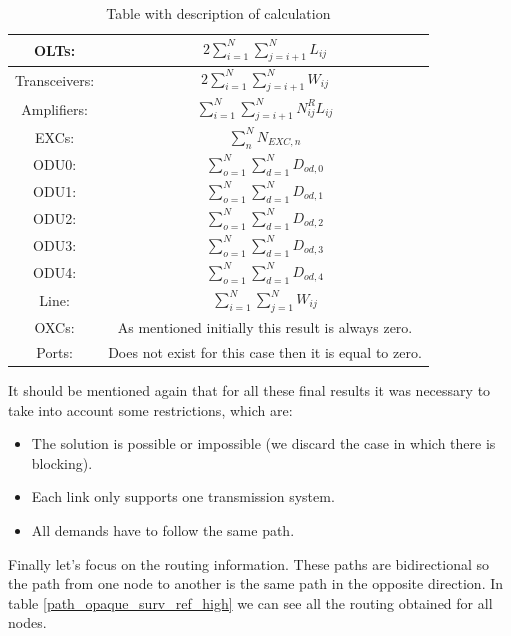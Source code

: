 \begin{table}[h!]
\centering
\begin{tabular}{|| c | c ||}
 \hline
 OLTs: & \(\displaystyle 2 \sum_{i=1}^{N}\sum_{j=i+1}^{N} L_{ij} \) \\ \hline
 Transceivers: & \(\displaystyle 2 \sum_{i=1}^{N}\sum_{j=i+1}^{N} W_{ij} \) \\ \hline
 Amplifiers: & \(\displaystyle \sum_{i=1}^{N}\sum_{j=i+1}^{N} N^R_{ij} L_{ij} \) \\ \hline
 EXCs: & \(\displaystyle \sum_n^N N_{EXC,n} \) \\ \hline
 ODU0: & \(\displaystyle \sum_{o=1}^{N}\sum_{d=1}^{N} D_{od,0} \) \\ \hline
 ODU1: & \(\displaystyle \sum_{o=1}^{N}\sum_{d=1}^{N} D_{od,1} \) \\ \hline
 ODU2: & \(\displaystyle \sum_{o=1}^{N}\sum_{d=1}^{N} D_{od,2} \)\\ \hline
 ODU3: & \(\displaystyle \sum_{o=1}^{N}\sum_{d=1}^{N} D_{od,3} \) \\ \hline
 ODU4: & \(\displaystyle \sum_{o=1}^{N}\sum_{d=1}^{N} D_{od,4} \) \\ \hline
 Line: & \(\displaystyle \sum_{i=1}^{N}\sum_{j=1}^{N} W_{ij} \) \\ \hline
 OXCs: & As mentioned initially this result is always zero. \\ \hline
 Ports: & Does not exist for this case then it is equal to zero. \\
 \hline
 \end{tabular}
\caption{Table with description of calculation}
\label{formulas_opaque_surv_ref_high}
\end{table}

\vspace{13pt}
It should be mentioned again that for all these final results it was necessary to take into account some restrictions, which are:
\begin{itemize}
  \item The solution is possible or impossible (we discard the case in which there is blocking).
  \item Each link only supports one transmission system.
  \item All demands have to follow the same path.
\end{itemize}

\newpage
Finally let's focus on the routing information. These paths are bidirectional so the path from one node to another is the same path in the opposite direction. In table \ref{path_opaque_surv_ref_high} we can see all the routing obtained for all nodes.\\

